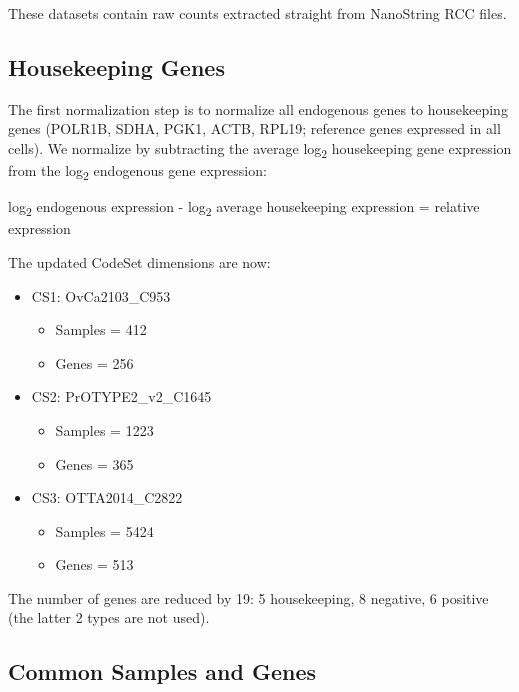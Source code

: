 \documentclass[
]{report}
\providecommand{\tightlist}{%
  \setlength{\itemsep}{0pt}\setlength{\parskip}{0pt}}
\begin{document}
These datasets contain raw counts extracted straight from NanoString RCC files.

\hypertarget{housekeeping-genes}{%
\subsection{Housekeeping Genes}\label{housekeeping-genes}}

The first normalization step is to normalize all endogenous genes to housekeeping genes (POLR1B, SDHA, PGK1, ACTB, RPL19; reference genes expressed in all cells). We normalize by subtracting the average log\textsubscript{2} housekeeping gene expression from the log\textsubscript{2} endogenous gene expression:

log\textsubscript{2} endogenous expression - log\textsubscript{2} average housekeeping expression = relative expression

The updated CodeSet dimensions are now:

\begin{itemize}
\item
  CS1: OvCa2103\_C953

  \begin{itemize}
  \tightlist
  \item
    Samples = 412
  \item
    Genes = 256
  \end{itemize}
\item
  CS2: PrOTYPE2\_v2\_C1645

  \begin{itemize}
  \tightlist
  \item
    Samples = 1223
  \item
    Genes = 365
  \end{itemize}
\item
  CS3: OTTA2014\_C2822

  \begin{itemize}
  \tightlist
  \item
    Samples = 5424
  \item
    Genes = 513
  \end{itemize}
\end{itemize}

The number of genes are reduced by 19: 5 housekeeping, 8 negative, 6 positive (the latter 2 types are not used).

\hypertarget{common-samples-and-genes}{%
\subsection{Common Samples and Genes}\label{common-samples-and-genes}}
\end{document}
